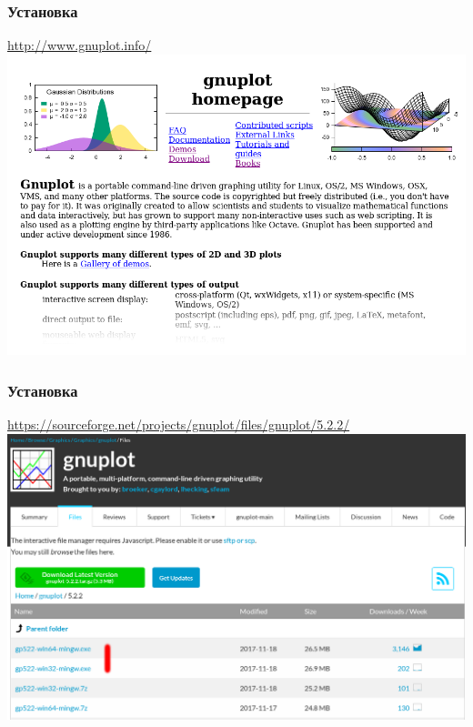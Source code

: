\documentclass[12pt, compress]{beamer}
\begin{document}
\begin{frame}[c]
\frametitle{Установка}
\url{http://www.gnuplot.info/}
\includegraphics[width=1.0\textwidth]{gnuplot.png}
\end{frame}

\begin{frame}[c]
\frametitle{Установка}
{\tiny
\url{https://sourceforge.net/projects/gnuplot/files/gnuplot/5.2.2/}
}
\includegraphics[width=1.0\textwidth]{install.png}
\end{frame}
\end{document}
